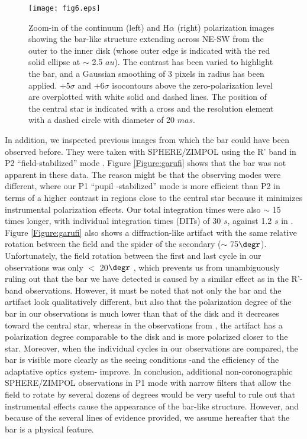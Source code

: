 \documentclass{aa}
\begin{document}
\begin{figure}
\centering
 \texttt{[image: fig6.eps]}
\caption{Zoom-in of the continuum (left) and H$\alpha$ (right) polarization images showing the bar-like structure extending across NE-SW from the outer to the inner disk (whose outer edge is indicated with the red solid ellipse at $\sim$ 2.5 $au$). The contrast has been varied to highlight the bar, and a Gaussian smoothing of 3 pixels in radius has been applied. +5$\sigma$ and +6$\sigma$ isocontours  above the zero-polarization level are overplotted with white solid and dashed lines. The position of the central star is indicated with a cross and the resolution element with a dashed circle with diameter of 20 $mas$.}
\label{Figure:bar}
\end{figure} 

In addition, we inspected previous images from which the bar could have been observed before. They were taken with SPHERE/ZIMPOL using the R' band in P2 ``field-stabilized'' mode \citep[see][]{Garufi16}. Figure \ref{Figure:garufi} shows that the bar was not apparent in these data. The reason might be that the observing modes were different, where our P1 ``pupil -stabilized'' mode is more efficient than P2 in terms of a higher contrast in regions close to the central star because it minimizes instrumental polarization effects. Our total integration times were also $\sim$ 15 times longer, with individual integration times (DITs) of 30 $s$, against 1.2 $s$ in \cite{Garufi16}. Figure \ref{Figure:garufi} also shows a diffraction-like artifact with the same relative rotation between the field and the spider of the secondary ($\sim$ 75$\degr$). Unfortunately, the field rotation between the first and last cycle in our observations was only $<$ 20$\degr$ , which prevents us from unambiguously ruling out that the bar we have detected is caused by a similar effect as in the R'-band observations. However, it must be noted that not only the bar and the artifact look qualitatively different, but also that the polarization degree of the bar in our observations is much lower than that of the disk and it decreases toward the central star, whereas in the observations from \citet{Garufi16}, the artifact has a polarization degree comparable to the disk and is more polarized closer to the star. Moreover, when the individual cycles in our observations are compared, the bar is visible more clearly as the seeing conditions -and the efficiency of the adaptative optics system- improve. In conclusion, additional non-coronographic SPHERE/ZIMPOL observations in P1 mode with narrow filters that
allow the field to rotate by several dozens of degrees would be very useful to rule out that instrumental effects cause the appearance of the bar-like structure. However, and because of the several lines of evidence provided, we assume hereafter that the bar is a physical feature.
\end{document}
